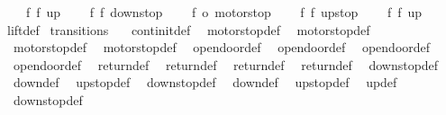 \begin{isabellebody}
\ \ \ \ {\isacharparenleft}{\isacharparenleft}f{}{\isacharcomma}\ f{}{\isacharparenright}{\isacharcomma}\ up{}{}{\isacharparenright}{\isacharcomma}\isanewline
\ \ \ \ {\isacharparenleft}{\isacharparenleft}f{}{\isacharcomma}\ f{}{\isacharparenright}{\isacharcomma}\ down{}{}stop{\isacharparenright}{\isacharcomma}\isanewline
\isanewline
\ \ \ \ {\isacharparenleft}{\isacharparenleft}f{}{\isacharcomma}\ o{}{\isacharparenright}{\isacharcomma}\ motorstop{}{\isacharparenright}{\isacharcomma}\isanewline
\ \ \ \ {\isacharparenleft}{\isacharparenleft}f{}{\isacharcomma}\ f{}{\isacharparenright}{\isacharcomma}\ up{}{}stop{\isacharparenright}{\isacharcomma}\isanewline
\ \ \ \ {\isacharparenleft}{\isacharparenleft}f{}{\isacharcomma}\ f{}{\isacharparenright}{\isacharcomma}\ up{}{}{\isacharparenright}\isanewline
\ \ {\isacharbar}{\isacharbraceright}{\isachardoublequoteclose}\isanewline
\isanewline
\isanewline
{}\isamarkupfalse%
\ lift{\isacharunderscore}def\isanewline
\isanewline
{}\isamarkupfalse%
\ transitions\ {\isacharequal}\isanewline
\ \ continit{\isacharunderscore}def\isanewline
\ \ motorstop{}{\isacharunderscore}def\isanewline
\ \ motorstop{}{\isacharunderscore}def\isanewline
\ \ motorstop{}{\isacharunderscore}def\isanewline
\ \ motorstop{}{\isacharunderscore}def\isanewline
\ \ opendoor{}{\isacharunderscore}def\isanewline
\ \ opendoor{}{\isacharunderscore}def\isanewline
\ \ opendoor{}{\isacharunderscore}def\isanewline
\ \ opendoor{}{\isacharunderscore}def\isanewline
\ \ return{}{\isacharunderscore}def\isanewline
\ \ return{}{\isacharunderscore}def\isanewline
\ \ return{}{\isacharunderscore}def\isanewline
\ \ return{}{\isacharunderscore}def\isanewline
\ \ down{}{}stop{\isacharunderscore}def\isanewline
\ \ down{}{}{\isacharunderscore}def\isanewline
\ \ up{}{}stop{\isacharunderscore}def\isanewline
\ \ down{}{}stop{\isacharunderscore}def\isanewline
\ \ down{}{}{\isacharunderscore}def\isanewline
\ \ up{}{}stop{\isacharunderscore}def\isanewline
\ \ up{}{}{\isacharunderscore}def\isanewline
\ \ down{}{}stop{\isacharunderscore}def\isanewline

\end{isabellebody}

